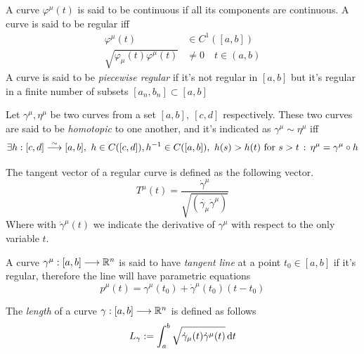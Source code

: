 \documentclass[../complete.tex]{subfiles}
\begin{document}
\begin{dfn}
	A curve $\varphi^\mu(t)$ is said to be continuous if all its components are continuous. A curve is said to be regular iff
	\begin{equation}
		\begin{aligned}
			\varphi^\mu(t)&\in C^1([a,b])\\
			\sqrt{\varphi_\mu(t)\varphi^\mu(t)}&\ne0\quad t\in(a,b)
		\end{aligned}
		\label{eq:regularity}
	\end{equation}
	A curve is said to be \textit{piecewise regular} if it's not regular in $[a,b]$ but it's regular in a finite number of subsets $[a_n,b_n]\subset[a,b]$
\end{dfn}
\begin{dfn}
	Let $\gamma^\mu,\eta^\mu$ be two curves from a set $[a,b],\ [c,d]$ respectively. These two curves are said to be \textit{homotopic} to one another, and it's indicated as $\gamma^\mu\sim\eta^\mu$ iff
	\begin{equation}
		\exists h:[c,d]\fto[\sim][a,b],\ h\in C([c,d]),h^{-1}\in C([a,b]),\ h(s)>h(t)\text{ for }s>t\st\eta^\mu=\gamma^\mu\circ h
		\label{eq:homotopy}
	\end{equation}
\end{dfn}
\begin{dfn}
	The tangent vector of a regular curve is defined as the following vector.
	\begin{equation}
		T^\mu(t)=\frac{\dot{\gamma}^\mu}{\sqrt{(\dot{\gamma_\mu}\dot{\gamma}^\mu)}}
		\label{eq:tangentvector}
	\end{equation}
	Where with $\dot{\gamma}^\mu(t)$ we indicate the derivative of $\gamma^\mu$ with respect to the only variable $t$.
\end{dfn}
\begin{dfn}
	A curve $\gamma^\mu:[a,b]\fto\R^n$ is said to have \textit{tangent line} at a point $t_0\in[a,b]$ if it's regular, therefore the line will have parametric equations
	\begin{equation}
		p^\mu(t)=\gamma^\mu(t_0)+\dot{\gamma}^\mu(t_0)(t-t_0)
		\label{eq:curvetanline}
	\end{equation}
\end{dfn}
\begin{dfn}
	The \textit{length} of a curve $\gamma:[a,b]\fto\R^n$ is defined as follows
	\begin{equation}
		L_\gamma:=\int_{a}^{b}\sqrt{\dot{\gamma}_\mu(t)\dot{\gamma}^\mu(t)}\diff{t}
		\label{eq:lengthcurve}
	\end{equation}
\end{dfn}
\end{document}
